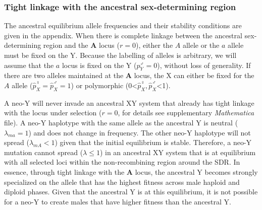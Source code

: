 \documentclass[12pt]{article}
\begin{document}
\subsubsection*{Tight linkage with the ancestral sex-determining region}

The ancestral equilibrium allele frequencies and their stability conditions are given in the appendix.
When there is complete linkage between the ancestral sex-determining region and the \textbf{A} locus ($r=0$), either the $A$ allele or the $a$ allele must be fixed on the Y. 
Because the labelling of alleles is arbitrary, we will assume that the $a$ locus is fixed on the Y ($p^\male_Y=0$), without loss of generality. 
If there are two alleles maintained at the \textbf{A} locus, the X can either be fixed for the $A$ allele ($\hat{p}^\female_X=\hat{p}^\male_X=1$) or polymorphic (0<$\hat{p}^\female_X, \hat{p}^\male_X$<1). 

A neo-Y will never invade an ancestral XY system that already has tight linkage with the locus under selection ($r=0$, for details see supplementary \textit{Mathematica} file). 
A neo-Y haplotype with the same allele as the ancestral Y is neutral ($\lambda_{ma}=1$) and does not change in frequency.
The other neo-Y haplotype will not spread ($\lambda_{mA}<1$) given that the initial equilibrium is stable. 
Therefore, a neo-Y mutation cannot spread ($\lambda \leq 1$) in an ancestral XY system that is at equilibrium with all selected loci within the non-recombining region around the SDR.
In essence, through tight linkage with the \textbf{A} locus, the ancestral Y becomes strongly specialized on the allele that has the highest fitness across male haploid and diploid phases. 
Given that the ancestral Y is at this equilibrium, it is not possible for a neo-Y to create males that have higher fitness than the ancestral Y. 

\end{document}
